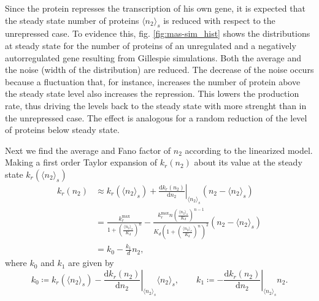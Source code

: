 Since the protein represses the transcription of his own gene, it is expected that the steady state number of proteins $\langle n_2\rangle_s$ is reduced with respect to the unrepressed case. To evidence this, fig. \ref{fig:mas-sim_hist} shows the distributions at steady state for the number of proteins of an unregulated and a negatively autorregulated gene resulting from Gillespie simulations. Both the average and the noise (width of the distribution) are reduced. The decrease of the noise occurs because a fluctuation that, for instance, increases the number of protein above the steady state level also increases the repression. This lowers the production rate, thus driving the levels back to the steady state with more strenght than in the unrepressed case. The effect is analogous for a random reduction of the level of proteins below steady state.

Next we find the average and Fano factor of $n_2$ according to the linearized model. Making a first order Taylor expansion of $k_r(n_2)$ about its value at the steady state $k_r(\langle n_2\rangle_s)$
\begin{equation}
  \begin{split}
  k_r(n_2) &\approx k_r(\langle n_2\rangle_s) + \left.\frac{\mathrm{d}k_r(n_2)}{\mathrm{d}n_2}\right|_{\langle n_2\rangle_s}\left(n_2-\langle n_2\rangle_s\right)\\
  &=\frac{k_r^{\text{max}}}{1+\left(\frac{\langle n_2\rangle_s}{K_d}\right)^n} - \frac{k_r^{\text{max}}n\left(\frac{\langle n_2\rangle_s}{K_d}\right)^{n-1}}{K_d\left(1+\left(\frac{\langle n_2\rangle_s}{K_d}\right)^n\right)^2}\left(n_2-\langle n_2\rangle_s\right)\\
  &= k_0-\frac{k_1}{d}n_2,
  \end{split}
\end{equation} 
where $k_0$ and $k_1$ are given by
\begin{equation*}
  k_0\coloneqq k_r(\langle n_2\rangle_s) - \left.\frac{\mathrm{d}k_r(n_2)}{\mathrm{d}n_2}\right|_{\langle n_2\rangle_s}\langle n_2\rangle_s,\quad\quad k_1 \coloneqq -\left.\frac{\mathrm{d}k_r(n_2)}{\mathrm{d}n_2}\right|_{\langle n_2\rangle_s}n_2. 
\end{equation*}

